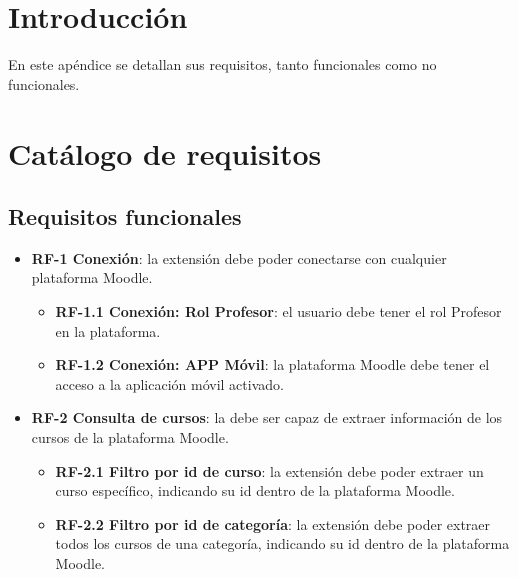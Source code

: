 
\section{Introducción}

En este apéndice se detallan sus requisitos, tanto funcionales como no funcionales.

\section{Catálogo de requisitos}
\subsection{Requisitos funcionales}

\begin{itemize}
	\item \textbf{RF-1 Conexión}: la extensión debe poder conectarse con cualquier plataforma Moodle.
    \begin{itemize}
		\item \textbf{RF-1.1 Conexión: Rol Profesor}: el usuario debe tener el rol Profesor en la plataforma.
		\item \textbf{RF-1.2 Conexión: APP Móvil}:  la plataforma Moodle debe tener el acceso a la aplicación móvil activado.
	\end{itemize}

	\item \textbf{RF-2 Consulta de cursos}: la debe ser capaz de extraer información de los cursos de la plataforma Moodle.
    \begin{itemize}
		\item \textbf{RF-2.1 Filtro por id de curso}: la extensión debe poder extraer un curso específico, indicando su id dentro de la plataforma Moodle.
		\item \textbf{RF-2.2 Filtro por id de categoría}: la extensión debe poder extraer todos los cursos de una categoría, indicando su id dentro de la plataforma Moodle.
	\end{itemize}


\end{itemize}
